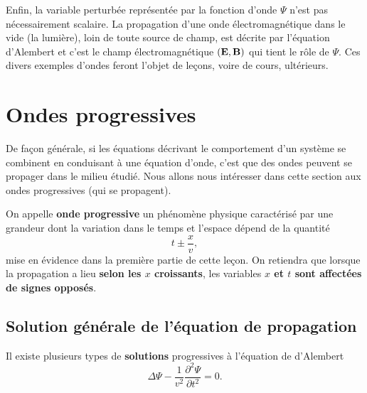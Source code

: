 \documentclass[11pt,a4paper]{report}
\begin{document}
Enfin, la variable perturbée représentée par la fonction d'onde $\Psi$ n'est pas nécessairement scalaire. La propagation d'une onde électromagnétique dans le vide (la lumière), loin de toute source de champ, est décrite par l'équation d'Alembert et c'est le champ électromagnétique $(\bold{E},\bold{B})$ qui tient le rôle de $\Psi$. Ces divers exemples d'ondes feront l'objet de leçons, voire de cours, ultérieurs.

\newpage
\section{Ondes progressives}\label{sec:2}

De façon générale, si les équations décrivant le comportement d'un système se combinent en conduisant à une équation d'onde, c'est que des ondes peuvent se propager dans le milieu étudié. Nous allons nous intéresser dans cette section aux ondes progressives (qui se propagent).

On appelle \textbf{onde progressive} un phénomène physique caractérisé par une grandeur dont la variation dans le temps et l'espace dépend de la quantité
\begin{equation}
	t \pm \frac{x}{v},
\end{equation}
mise en évidence dans la première partie de cette leçon. On retiendra que lorsque la propagation a lieu \textbf{selon les $x$ croissants}, les variables \textbf{$x$ et $t$ sont affectées de signes opposés}.

\subsection{Solution générale de l'équation de propagation}

Il existe plusieurs types de \textbf{solutions} progressives à l'équation de d'Alembert
\begin{equation}
	\Delta \Psi - \frac{1}{v^2} \frac{\partial^2\Psi}{\partial t^2} = 0.
\end{equation}
\end{document}
